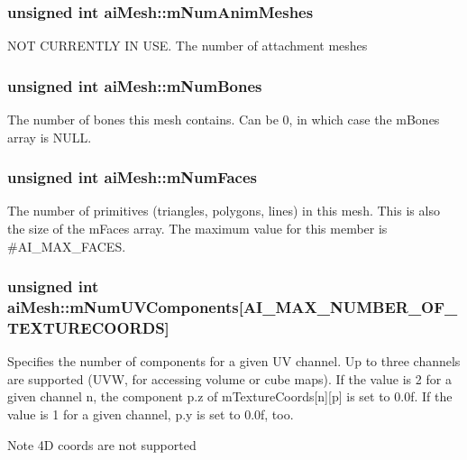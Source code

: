 \subsubsection[{\texorpdfstring{m\+Num\+Anim\+Meshes}{mNumAnimMeshes}}]{\setlength{\rightskip}{0pt plus 5cm}unsigned int ai\+Mesh\+::m\+Num\+Anim\+Meshes}\hypertarget{structai_mesh_a1692a300222b32348ae51779df4a697e}{}\label{structai_mesh_a1692a300222b32348ae51779df4a697e}
N\+OT C\+U\+R\+R\+E\+N\+T\+LY IN U\+SE. The number of attachment meshes 
\subsubsection[{\texorpdfstring{m\+Num\+Bones}{mNumBones}}]{\setlength{\rightskip}{0pt plus 5cm}unsigned int ai\+Mesh\+::m\+Num\+Bones}\hypertarget{structai_mesh_a0f9d5425b6300e32a842a94f943fd79e}{}\label{structai_mesh_a0f9d5425b6300e32a842a94f943fd79e}
The number of bones this mesh contains. Can be 0, in which case the m\+Bones array is N\+U\+LL. 
\subsubsection[{\texorpdfstring{m\+Num\+Faces}{mNumFaces}}]{\setlength{\rightskip}{0pt plus 5cm}unsigned int ai\+Mesh\+::m\+Num\+Faces}\hypertarget{structai_mesh_aeed22ee6963b79548f3877b3c905518e}{}\label{structai_mesh_aeed22ee6963b79548f3877b3c905518e}
The number of primitives (triangles, polygons, lines) in this mesh. This is also the size of the m\+Faces array. The maximum value for this member is \#\+A\+I\+\_\+\+M\+A\+X\+\_\+\+F\+A\+C\+ES. 
\subsubsection[{\texorpdfstring{m\+Num\+U\+V\+Components}{mNumUVComponents}}]{\setlength{\rightskip}{0pt plus 5cm}unsigned int ai\+Mesh\+::m\+Num\+U\+V\+Components\mbox{[}A\+I\+\_\+\+M\+A\+X\+\_\+\+N\+U\+M\+B\+E\+R\+\_\+\+O\+F\+\_\+\+T\+E\+X\+T\+U\+R\+E\+C\+O\+O\+R\+DS\mbox{]}}\hypertarget{structai_mesh_a635c631a6e66d32989d6b25b2a892d86}{}\label{structai_mesh_a635c631a6e66d32989d6b25b2a892d86}
Specifies the number of components for a given UV channel. Up to three channels are supported (U\+VW, for accessing volume or cube maps). If the value is 2 for a given channel n, the component p.\+z of m\+Texture\+Coords\mbox{[}n\mbox{]}\mbox{[}p\mbox{]} is set to 0.\+0f. If the value is 1 for a given channel, p.\+y is set to 0.\+0f, too. \begin{DoxyNote}{Note}
4D coords are not supported 
\end{DoxyNote}
